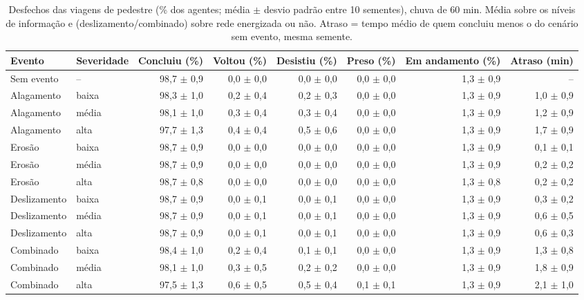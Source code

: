 \begin{table}[htbp]
\centering
\scriptsize
\caption{Desfechos das viagens de pedestre (\% dos agentes; média $\pm$ desvio padrão entre 10 sementes), chuva de 60 min. Média sobre os níveis de informação e (deslizamento/combinado) sobre rede energizada ou não. Atraso = tempo médio de quem concluiu menos o do cenário sem evento, mesma semente.}
\label{tab:t1_60_pedestre}
\begin{tabular}{llrrrrrr}
\toprule
Evento & Severidade & Concluiu (\%) & Voltou (\%) & Desistiu (\%) & Preso (\%) & Em andamento (\%) & Atraso (min) \\
\midrule
Sem evento & -- & 98,7 $\pm$ 0,9 & 0,0 $\pm$ 0,0 & 0,0 $\pm$ 0,0 & 0,0 $\pm$ 0,0 & 1,3 $\pm$ 0,9 & -- \\
Alagamento & baixa & 98,3 $\pm$ 1,0 & 0,2 $\pm$ 0,4 & 0,2 $\pm$ 0,3 & 0,0 $\pm$ 0,0 & 1,3 $\pm$ 0,9 & 1,0 $\pm$ 0,9 \\
Alagamento & média & 98,1 $\pm$ 1,0 & 0,3 $\pm$ 0,4 & 0,3 $\pm$ 0,4 & 0,0 $\pm$ 0,0 & 1,3 $\pm$ 0,9 & 1,2 $\pm$ 0,9 \\
Alagamento & alta & 97,7 $\pm$ 1,3 & 0,4 $\pm$ 0,4 & 0,5 $\pm$ 0,6 & 0,0 $\pm$ 0,0 & 1,3 $\pm$ 0,9 & 1,7 $\pm$ 0,9 \\
Erosão & baixa & 98,7 $\pm$ 0,9 & 0,0 $\pm$ 0,0 & 0,0 $\pm$ 0,0 & 0,0 $\pm$ 0,0 & 1,3 $\pm$ 0,9 & 0,1 $\pm$ 0,1 \\
Erosão & média & 98,7 $\pm$ 0,9 & 0,0 $\pm$ 0,0 & 0,0 $\pm$ 0,0 & 0,0 $\pm$ 0,0 & 1,3 $\pm$ 0,9 & 0,2 $\pm$ 0,2 \\
Erosão & alta & 98,7 $\pm$ 0,8 & 0,0 $\pm$ 0,0 & 0,0 $\pm$ 0,0 & 0,0 $\pm$ 0,0 & 1,3 $\pm$ 0,8 & 0,2 $\pm$ 0,2 \\
Deslizamento & baixa & 98,7 $\pm$ 0,9 & 0,0 $\pm$ 0,1 & 0,0 $\pm$ 0,1 & 0,0 $\pm$ 0,0 & 1,3 $\pm$ 0,9 & 0,3 $\pm$ 0,2 \\
Deslizamento & média & 98,7 $\pm$ 0,9 & 0,0 $\pm$ 0,1 & 0,0 $\pm$ 0,1 & 0,0 $\pm$ 0,0 & 1,3 $\pm$ 0,9 & 0,6 $\pm$ 0,5 \\
Deslizamento & alta & 98,7 $\pm$ 0,9 & 0,0 $\pm$ 0,1 & 0,0 $\pm$ 0,1 & 0,0 $\pm$ 0,0 & 1,3 $\pm$ 0,9 & 0,6 $\pm$ 0,3 \\
Combinado & baixa & 98,4 $\pm$ 1,0 & 0,2 $\pm$ 0,4 & 0,1 $\pm$ 0,1 & 0,0 $\pm$ 0,0 & 1,3 $\pm$ 0,9 & 1,3 $\pm$ 0,8 \\
Combinado & média & 98,1 $\pm$ 1,0 & 0,3 $\pm$ 0,5 & 0,2 $\pm$ 0,2 & 0,0 $\pm$ 0,0 & 1,3 $\pm$ 0,9 & 1,8 $\pm$ 0,9 \\
Combinado & alta & 97,5 $\pm$ 1,3 & 0,6 $\pm$ 0,5 & 0,5 $\pm$ 0,4 & 0,1 $\pm$ 0,1 & 1,3 $\pm$ 0,9 & 2,1 $\pm$ 1,0 \\
\bottomrule
\end{tabular}
\end{table}
